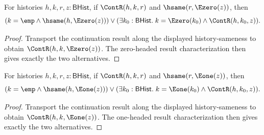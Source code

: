 \begin{theorem}
\label{thm:cont-result-hsame-e0-cases}
For histories $h,k,r,z:\mathsf{BHist}$, if $\ContR(h,k,r)$ and
$\hsame(r,\Ezero(z))$, then
$$
(k=\emp\land \hsame(h,\Ezero(z)))
\lor
(\exists k_0:\mathsf{BHist}.\; k=\Ezero(k_0)\land \ContR(h,k_0,z)).
$$
\end{theorem}
\begin{proof}
Transport the continuation result along the displayed history-sameness to obtain
$\ContR(h,k,\Ezero(z))$. The zero-headed result characterization then gives
exactly the two alternatives.
\end{proof}

\begin{theorem}
\label{thm:cont-result-hsame-e1-cases}
For histories $h,k,r,z:\mathsf{BHist}$, if $\ContR(h,k,r)$ and
$\hsame(r,\Eone(z))$, then
$$
(k=\emp\land \hsame(h,\Eone(z)))
\lor
(\exists k_0:\mathsf{BHist}.\; k=\Eone(k_0)\land \ContR(h,k_0,z)).
$$
\end{theorem}
\begin{proof}
Transport the continuation result along the displayed history-sameness to obtain
$\ContR(h,k,\Eone(z))$. The one-headed result characterization then gives
exactly the two alternatives.
\end{proof}
